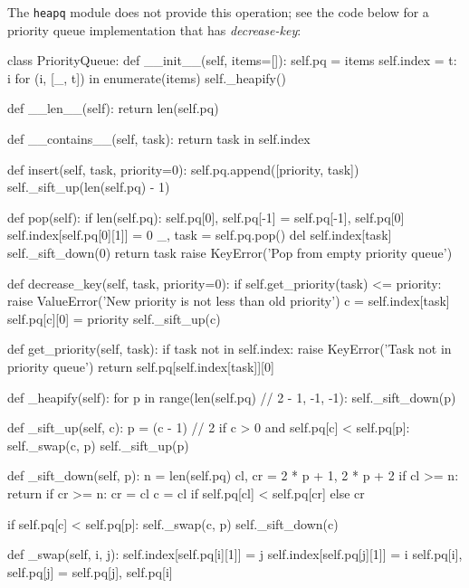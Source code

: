 \documentclass[12pt, titlepage]{article}
\begin{document}
The \texttt{heapq} module does not provide this operation; see the code below for a priority queue implementation that has \textit{decrease-key}:
\medskip
\begin{python}
class PriorityQueue:
    def __init__(self, items=[]):
        self.pq = items
        self.index = {t: i for (i, [_, t]) in enumerate(items)}
        self._heapify()

    def __len__(self):
        return len(self.pq)

    def __contains__(self, task):
        return task in self.index

    def insert(self, task, priority=0):
        self.pq.append([priority, task])
        self._sift_up(len(self.pq) - 1)

    def pop(self):
        if len(self.pq):
            self.pq[0], self.pq[-1] = self.pq[-1], self.pq[0]
            self.index[self.pq[0][1]] = 0
            _, task = self.pq.pop()
            del self.index[task]
            self._sift_down(0)
            return task
        raise KeyError('Pop from empty priority queue')

    def decrease_key(self, task, priority=0):
        if self.get_priority(task) <= priority:
            raise ValueError('New priority is not less than old priority')
        c = self.index[task]
        self.pq[c][0] = priority
        self._sift_up(c)

    def get_priority(self, task):
        if task not in self.index:
            raise KeyError('Task not in priority queue')
        return self.pq[self.index[task]][0]

    def _heapify(self):
        for p in range(len(self.pq) // 2 - 1, -1, -1):
            self._sift_down(p)

    def _sift_up(self, c):
        p = (c - 1) // 2
        if c > 0 and self.pq[c] < self.pq[p]:
            self._swap(c, p)
            self._sift_up(p)

    def _sift_down(self, p):
        n = len(self.pq)
        cl, cr = 2 * p + 1, 2 * p + 2
        if cl >= n:
            return
        if cr >= n:
            cr = cl
        c = cl if self.pq[cl] < self.pq[cr] else cr

        if self.pq[c] < self.pq[p]:
            self._swap(c, p)
            self._sift_down(c)

    def _swap(self, i, j):
        self.index[self.pq[i][1]] = j
        self.index[self.pq[j][1]] = i
        self.pq[i], self.pq[j] = self.pq[j], self.pq[i]
\end{python}
\end{document}
